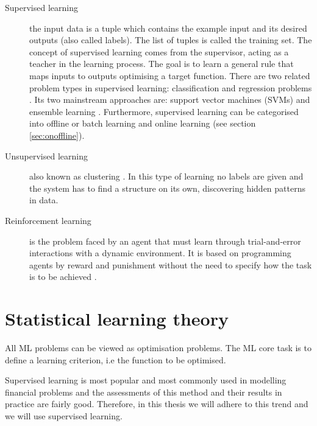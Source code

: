 \begin{description}
\item[Supervised learning]  the input data is a tuple which contains the example
input and its desired outputs (also called labels). The list of tuples is called
the training set. The concept of supervised learning comes from the supervisor,
acting as a teacher in the learning process. The goal is to learn a general rule
that maps inputs to outputs optimising a target function. There are two related
problem types in supervised learning: classification and regression problems
\cite{bishop2006}. Its two mainstream approaches are: support vector machines
(SVMs) \cite{vapnik1998} and ensemble learning \cite{breiman1998}. Furthermore,
supervised learning can be categorised into offline or batch learning and online
learning (see section \ref{sec:onoffline}). 
\item[Unsupervised learning] also known as clustering \cite{ben2005}. In this
type of learning no labels are given and the system has to find a structure on
its own, discovering hidden patterns in data.
\item[Reinforcement learning] is the problem faced by an agent that must learn
through trial-and-error interactions with a dynamic environment. It is based on
programming agents by reward and punishment without the need to specify how the
task is to be achieved \cite{sutton1998}.
\end{description}


\section{Statistical learning theory} \label{sec:mltheory}

All ML problems can be viewed as optimisation problems. The ML core task is to
define a learning criterion, i.e the function to be optimised. 

Supervised learning is most popular and most commonly used in modelling
financial problems and the assessments of this method and their results in
practice are fairly good. Therefore, in this thesis we will adhere to this trend
and we will use supervised learning.

